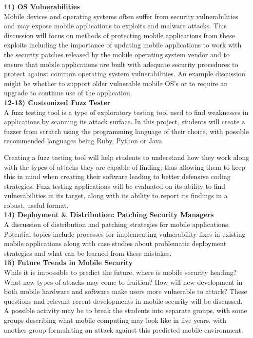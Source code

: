 \documentclass{sig-alternate}
\begin{document}
\textbf{11) OS Vulnerabilities}\\
Mobile devices and operating systems often suffer from security vulnerabilities and may expose mobile applications to exploits and malware attacks. This discussion will focus on methods of protecting mobile applications from these exploits including the importance of updating mobile applications to work with the security patches released by the mobile operating system vendor and to ensure that mobile applications are built with adequate security procedures to protect against common operating system vulnerabilities.  An example discussion might be whether to support older vulnerable mobile OS's or to require an upgrade to continue use of the application. \\

\textbf{12-13) Customized Fuzz Tester}\\
A fuzz testing tool is a type of exploratory testing tool used to find weaknesses in applications by scanning its attack surface. In this project, students will create a fuzzer from scratch using the programming language of their choice, with possible recommended languages being Ruby, Python or Java.

Creating a fuzz testing tool will help students to understand how they work along with the types of attacks they are capable of finding; thus allowing them to keep this in mind when creating their software leading to better defensive coding strategies. Fuzz testing applications will be evaluated on its ability to find vulnerabilities in its target, along with its ability to report its findings in a robust, useful format. \\

\textbf{14) Deployment \& Distribution: Patching Security Managers}\\
A discussion of distribution and patching strategies for mobile applications. Potential topics include processes for implementing vulnerability fixes in existing mobile applications along with case studies about problematic deployment strategies and what can be learned from these mistakes. \\

\textbf{15) Future Trends in Mobile Security}\\
While it is impossible to predict the future, where is mobile security heading? What new types of attacks may come to fruition? How will new development in both mobile hardware and software make users more vulnerable to attack? These questions and relevant recent developments in mobile security will be discussed. A possible activity may be to break the students into separate groups, with some groups describing what mobile computing may look like in five years, with another group formulating an attack against this predicted mobile environment.  \\
\end{document}
